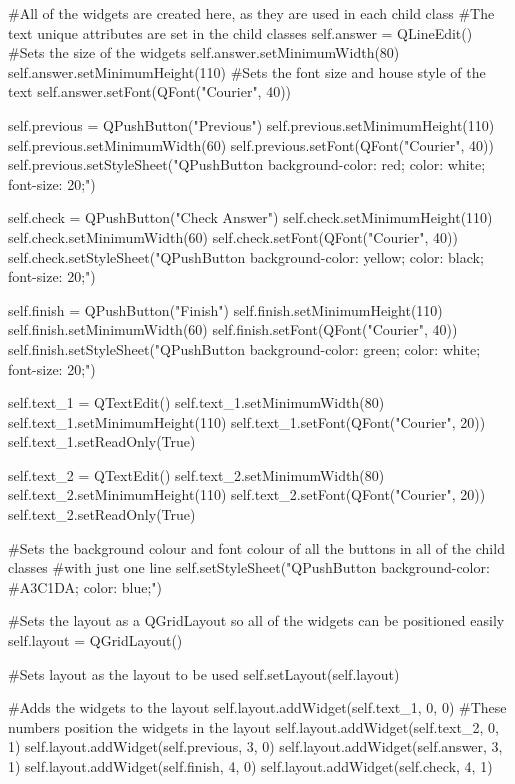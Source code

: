 \begin{landscape}
\begin{python}
        #All of the widgets are created here, as they are used in each child class
        #The text unique attributes are set in the child classes
        self.answer = QLineEdit()
        #Sets the size of the widgets
        self.answer.setMinimumWidth(80)
        self.answer.setMinimumHeight(110)
        #Sets the font size and house style of the text
        self.answer.setFont(QFont("Courier", 40))
        
        self.previous = QPushButton("Previous")
        self.previous.setMinimumHeight(110)
        self.previous.setMinimumWidth(60)
        self.previous.setFont(QFont("Courier", 40))
        self.previous.setStyleSheet("QPushButton {background-color: red; color: white; font-size: 20;}")
        
        self.check = QPushButton("Check Answer")
        self.check.setMinimumHeight(110)
        self.check.setMinimumWidth(60)
        self.check.setFont(QFont("Courier", 40))
        self.check.setStyleSheet("QPushButton {background-color: yellow; color: black; font-size: 20;}")
        
        self.finish = QPushButton("Finish")
        self.finish.setMinimumHeight(110)
        self.finish.setMinimumWidth(60)
        self.finish.setFont(QFont("Courier", 40))
        self.finish.setStyleSheet("QPushButton {background-color: green; color: white; font-size: 20;}")

        self.text_1 = QTextEdit()
        self.text_1.setMinimumWidth(80)
        self.text_1.setMinimumHeight(110)
        self.text_1.setFont(QFont("Courier", 20))
        self.text_1.setReadOnly(True)
        
        self.text_2 = QTextEdit()
        self.text_2.setMinimumWidth(80)
        self.text_2.setMinimumHeight(110)
        self.text_2.setFont(QFont("Courier", 20))
        self.text_2.setReadOnly(True)

        #Sets the background colour and font colour of all the buttons in all of the child classes
        #with just one line
        self.setStyleSheet("QPushButton {background-color: #A3C1DA; color: blue;}")

        #Sets the layout as a QGridLayout so all of the widgets can be positioned easily
        self.layout = QGridLayout()

        #Sets layout as the layout to be used
        self.setLayout(self.layout)

        #Adds the widgets to the layout
        self.layout.addWidget(self.text_1, 0, 0) #These numbers position the widgets in the layout
        self.layout.addWidget(self.text_2, 0, 1)
        self.layout.addWidget(self.previous, 3, 0)
        self.layout.addWidget(self.answer, 3, 1)
        self.layout.addWidget(self.finish, 4, 0)
        self.layout.addWidget(self.check, 4, 1)


\end{python}
\end{landscape}
